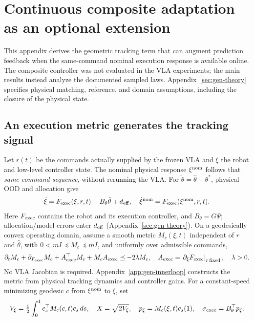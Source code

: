 \section{Continuous composite adaptation as an optional extension}
\label{sec:composite-extension}
This appendix derives the geometric tracking term that can augment
prediction feedback when the same-command nominal execution response is
available online. The composite controller was not evaluated in the VLA
experiments; the main results instead analyze the documented sampled laws.
Appendix~\ref{sec:gen-theory} specifies physical matching, reference,
and domain assumptions, including the closure of the physical state.

\subsection{An execution metric generates the tracking signal}
Let $r(t)$ be the commands actually supplied by the frozen VLA and $\xi$
the robot and low-level controller state. The nominal physical response
$\xi^{\rm nom}$ follows that \emph{same command sequence}, without rerunning the
VLA. For $\tilde\theta=\hat\theta-\theta^*$, physical OOD and allocation give
\begin{equation}
 \dot\xi=F_{\rm exec}(\xi,r,t)-B_\theta\tilde\theta+d_{\rm eff},
 \quad \dot\xi^{\rm nom}=F_{\rm exec}(\xi^{\rm nom},r,t).
 \label{eq:gen-matching}
\end{equation}
Here $F_{\rm exec}$ contains the robot and its execution controller, and
$B_\theta=G\Psi$; allocation/model errors enter $d_{\rm eff}$
(Appendix~\ref{sec:gen-theory}). On a geodesically convex operating domain,
assume a smooth metric $M_c(\xi,t)$ independent of $r$ and $\hat\theta$,
with $0<\underline mI\preceq M_c\preceq\overline mI$, and uniformly over
admissible commands,
\begin{equation}
 \partial_tM_c+\partial_{F_{\rm exec}}M_c+
 A_{\rm exec}^\top M_c+M_cA_{\rm exec}\preceq-2\lambda M_c,
 \quad A_{\rm exec}=\left.\partial_\xi F_{\rm exec}\right|_{r\,\mathrm{fixed}},
 \quad\lambda>0.
 \label{eq:contraction-metric}
\end{equation}
No VLA Jacobian is required. Appendix~\ref{app:gen-innerloop} constructs
the metric from physical tracking dynamics and controller gains.
For a constant-speed minimizing geodesic $c$ from $\xi^{\rm nom}$ to $\xi$, set
\begin{equation}
 V_\xi=\tfrac12\int_0^1c_s^\top M_c(c,t)c_s\,ds,\quad
 X=\sqrt{2V_\xi},\quad p_\xi=M_c(\xi,t)c_s(1),\quad
 \sigma_{\rm exec}=B_\theta^\top p_\xi.
 \label{eq:contraction-energy}
\end{equation}
